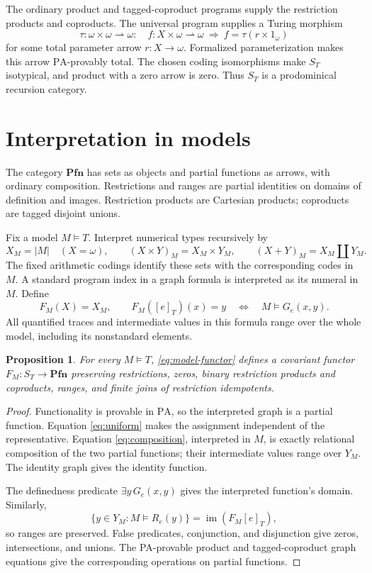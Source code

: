 \documentclass[11pt]{article}
\newtheorem{proposition}[theorem]{Proposition}
\newcommand{\PA}{\mathrm{PA}}
\newcommand{\Pfn}{\mathbf{Pfn}}
\begin{document}
The ordinary product and tagged-coproduct programs supply the restriction
products and coproducts. The universal program supplies a Turing morphism
\[
 \tau:\omega\times\omega\rightharpoonup\omega:
 \quad f:X\times\omega\rightharpoonup\omega
 \ \Longrightarrow\ 
 f=\tau(r\times1_\omega)
\]
for some total parameter arrow $r:X\to\omega$. Formalized
parameterization makes this arrow $\PA$-provably total. The chosen coding
isomorphisms make $S_T$ isotypical, and product with a zero arrow is zero.
Thus $S_T$ is a prodominical recursion category.

\section{Interpretation in models}\label{sec:models}

The category $\Pfn$ has sets as objects and partial functions as arrows,
with ordinary composition. Restrictions and ranges are partial identities
on domains of definition and images. Restriction products are Cartesian products;
coproducts are tagged disjoint unions.

Fix a model $M\models T$. Interpret numerical types recursively by
\[
 X_M=|M|\quad(X=\omega),\qquad
 (X\times Y)_M=X_M\times Y_M,\qquad
 (X+Y)_M=X_M\amalg Y_M.
\]
The fixed arithmetic codings identify these sets with the corresponding
codes in $M$. A standard program index in a graph formula is interpreted
as its numeral in $M$. Define
\begin{equation}\label{eq:model-functor}
 F_M(X)=X_M,\qquad
 F_M([e]_T)(x)=y
 \quad\Longleftrightarrow\quad M\models G_e(x,y).
\end{equation}
All quantified traces and intermediate values in this formula range over
the whole model, including its nonstandard elements.

\begin{proposition}\label{prop:model}
For every $M\models T$, \eqref{eq:model-functor} defines a covariant
functor $F_M:S_T\to\Pfn$ preserving restrictions, zeros, binary
restriction products and coproducts, ranges, and finite joins of
restriction idempotents.
\end{proposition}
\begin{proof}
Functionality is provable in $\PA$, so the interpreted graph is a
partial function. Equation \eqref{eq:uniform} makes the assignment
independent of the representative. Equation \eqref{eq:composition},
interpreted in $M$, is exactly relational composition of the two partial
functions; their intermediate values range over $Y_M$. The identity
graph gives the identity function.

The definedness predicate $\exists y\,G_e(x,y)$ gives the interpreted
function's domain. Similarly,
\[
 \{y\in Y_M:M\models R_e(y)\}
 =\operatorname{im}(F_M[e]_T),
\]
so ranges are preserved. False predicates, conjunction, and disjunction
give zeros, intersections, and unions. The PA-provable product and
tagged-coproduct graph equations give the corresponding operations on
partial functions.
\end{proof}
\end{document}
